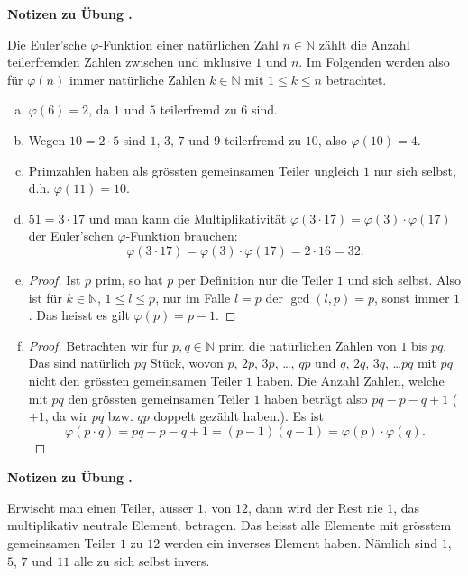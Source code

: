 \documentclass[%
11pt,%
twoside,%
titlepage,%
swissgerman,%
headsepline%
]{scrartcl}
\newcommand{\faReturnGray}{\textcolor{gray}{\faMailReply}} %
\theoremstyle{definition}
\theoremstyle{plain}
\newcommand{\concatueb}[1]{ueb:#1}%
\newcommand{\concatlsg}[1]{lsg:#1}%
\newcounter{uebcounter}[section]
\renewcommand{\theuebcounter}{\thesection.\arabic{uebcounter}}  %
\newenvironment{lsg}[1]{%
    \par\noindent\textbf{Notizen zu Übung \theuebcounter\label{\concatlsg{#1}}}
    \hfill\hyperref[\concatueb{#1}]{\faReturnGray}\par %
}{%
    \par%
}
\begin{document}
\begin{lsg}{eulerphi}
    Die Euler'sche $\varphi$-Funktion einer natürlichen Zahl $n\in\mathbb{N}$ zählt die Anzahl teilerfremden Zahlen zwischen und inklusive $1$ und $n$. Im Folgenden werden also für $\varphi(n)$ immer natürliche Zahlen $k\in\mathbb{N}$ mit $1\leq k\leq n$ betrachtet.
        \begin{enumerate}[a)]
        \item $\varphi(6)=2$, da $1$ und $5$ teilerfremd zu $6$ sind.
        \item Wegen $10=2\cdot5$ sind $1$, $3$, $7$ und $9$ teilerfremd zu $10$, also $\varphi(10)=4$.
        \item Primzahlen haben als grössten gemeinsamen Teiler ungleich $1$ nur sich selbst, d.h. $\varphi(11)=10$.
        \item $51=3\cdot 17$ und man kann die Multiplikativität $\varphi(3\cdot17)=\varphi(3)\cdot\varphi(17)$ der Euler'schen $\varphi$-Funktion brauchen:
        $$\varphi(3\cdot17)=\varphi(3)\cdot\varphi(17)=2\cdot16=32.$$
        \item \begin{proof}
            Ist $p$ prim, so hat $p$ per Definition nur die Teiler $1$ und sich selbst. Also ist für $k\in\mathbb{N}$, $1\leq l\leq p$, nur im Falle $l=p$ der $\gcd(l,p)=p$, sonst immer $1$. Das heisst es gilt $\varphi(p)=p-1$.
        \end{proof}
        \item \begin{proof}
            Betrachten wir für $p,q\in\mathbb{N}$ prim die natürlichen Zahlen von $1$ bis $pq$. Das sind natürlich $pq$ Stück, wovon $p$, $2p$, $3p$, \dots, $qp$ und $q$, $2q$, $3q$, \dots $pq$ mit $pq$ nicht den grössten gemeinsamen Teiler $1$ haben. Die Anzahl Zahlen, welche mit $pq$ den grössten gemeinsamen Teiler $1$ haben beträgt also $pq-p-q+1$ ($+1$, da wir $pq$ bzw. $qp$ doppelt gezählt haben.). Es ist
            $$\varphi(p\cdot q)=pq-p-q+1=(p-1)(q-1)=\varphi(p)\cdot\varphi(q).$$
        \end{proof}
    \end{enumerate}
\end{lsg}
\begin{lsg}{woinverse}
    Erwischt man einen Teiler, ausser $1$, von $12$, dann wird der Rest nie $1$, das multiplikativ neutrale Element, betragen. Das heisst alle Elemente mit grösstem gemeinsamen Teiler $1$ zu $12$ werden ein inverses Element haben. Nämlich sind $1$, $5$, $7$ und $11$ alle zu sich selbst invers.
\end{lsg}
\end{document}
